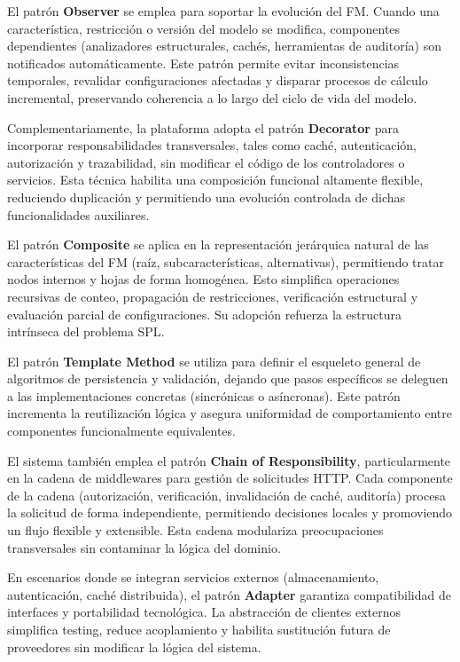 {{        El patrón \textbf{Observer} se emplea para soportar la evolución del \ac{FM}. Cuando una 
        característica, restricción o versión del modelo se modifica, componentes dependientes 
        (analizadores estructurales, cachés, herramientas de auditoría) son notificados 
        automáticamente. Este patrón permite evitar inconsistencias temporales, revalidar 
        configuraciones afectadas y disparar procesos de cálculo incremental, preservando 
        coherencia a lo largo del ciclo de vida del modelo.

        Complementariamente, la plataforma adopta el patrón \textbf{Decorator} para incorporar 
        responsabilidades transversales, tales como caché, autenticación, autorización y 
        trazabilidad, sin modificar el código de los controladores o servicios. Esta técnica 
        habilita una composición funcional altamente flexible, reduciendo duplicación y 
        permitiendo una evolución controlada de dichas funcionalidades auxiliares.

        El patrón \textbf{Composite} se aplica en la representación jerárquica natural de las 
        características del \ac{FM} (raíz, subcaracterísticas, alternativas), permitiendo tratar 
        nodos internos y hojas de forma homogénea. Esto simplifica operaciones recursivas de 
        conteo, propagación de restricciones, verificación estructural y evaluación parcial de 
        configuraciones. Su adopción refuerza la estructura intrínseca del problema \ac{SPL}.

        El patrón \textbf{Template Method} se utiliza para definir el esqueleto general de 
        algoritmos de persistencia y validación, dejando que pasos específicos se deleguen a 
        las implementaciones concretas (sincrónicas o asíncronas). Este patrón incrementa la 
        reutilización lógica y asegura uniformidad de comportamiento entre componentes 
        funcionalmente equivalentes.

        El sistema también emplea el patrón \textbf{Chain of Responsibility}, particularmente en la 
        cadena de middlewares para gestión de solicitudes \ac{HTTP}. Cada componente de la cadena 
        (autorización, verificación, invalidación de caché, auditoría) procesa la solicitud de 
        forma independiente, permitiendo decisiones locales y promoviendo un flujo flexible y 
        extensible. Esta cadena modulariza preocupaciones transversales sin contaminar la 
        lógica del dominio.

        En escenarios donde se integran servicios externos (almacenamiento, autenticación, 
        caché distribuida), el patrón \textbf{Adapter} garantiza compatibilidad de interfaces y 
        portabilidad tecnológica. La abstracción de clientes externos simplifica testing, 
        reduce acoplamiento y habilita sustitución futura de proveedores sin modificar la 
        lógica del sistema.

}}
